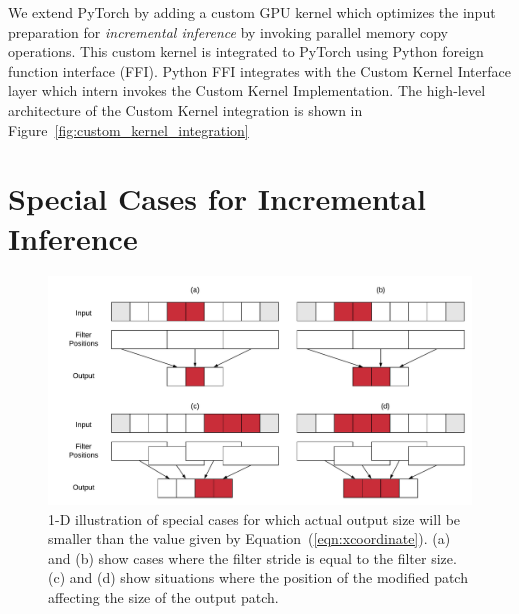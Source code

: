 We extend PyTorch by adding a custom GPU kernel which optimizes the input preparation for \textit{incremental inference} by invoking parallel memory copy operations.
This custom kernel is integrated to PyTorch using Python foreign function interface (FFI).
Python FFI integrates with the Custom Kernel Interface layer which intern invokes the Custom Kernel Implementation.
The high-level architecture of the Custom Kernel integration is shown in Figure~\ref{fig:custom_kernel_integration}


\section{Special Cases for Incremental Inference}

\begin{figure}[t]
\includegraphics[width=\columnwidth]{images/less_one_example}
\vspace{-6mm}
\caption{1-D illustration of special cases for which actual output size will be smaller than the value given by Equation~(\ref{eqn:xcoordinate}). (a) and (b) show cases where the filter stride is equal to the filter size. (c) and (d) show situations where the position of the modified patch affecting the size of the output patch.}
\vspace{-4mm}
\label{fig:less_one_example}
\end{figure}


